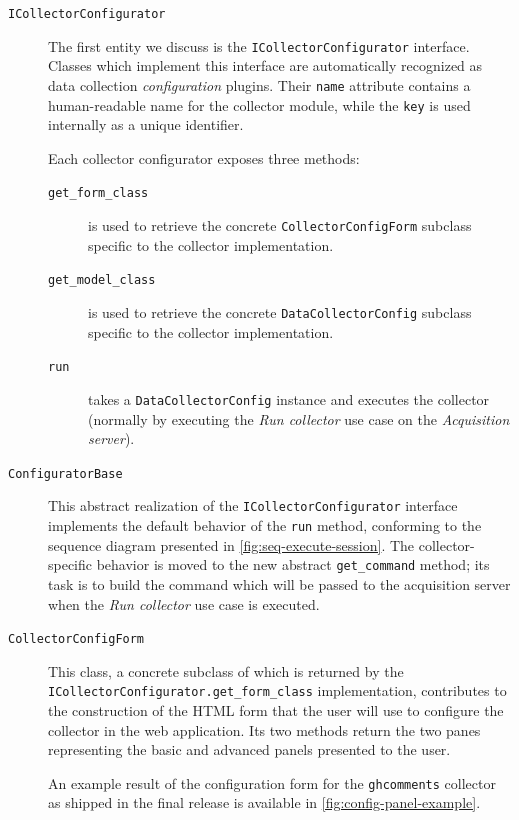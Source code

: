 \begin{description}
  \item[\texttt{ICollectorConfigurator}] The first entity we discuss is the \texttt{ICollectorConfigurator} interface. Classes which implement this interface are automatically recognized as data collection \emph{configuration} plugins. Their \texttt{name} attribute contains a human-readable name for the collector module, while the \texttt{key} is used internally as a unique identifier.

    Each collector configurator exposes three methods:
    \begin{description}
      \item[\texttt{get\_form\_class}] is used to retrieve the concrete \texttt{CollectorConfigForm} subclass specific to the collector implementation.
      \item[\texttt{get\_model\_class}] is used to retrieve the concrete \texttt{DataCollectorConfig} subclass specific to the collector implementation.
      \item[\texttt{run}] takes a \texttt{DataCollectorConfig} instance and executes the collector (normally by executing the \emph{Run collector} use case on the \emph{Acquisition server}).
    \end{description}
  
  \item[\texttt{ConfiguratorBase}] This abstract realization of the \texttt{ICollectorConfigurator} interface implements the default behavior of the \texttt{run} method, conforming to the sequence diagram presented in \vref{fig:seq-execute-session}. The collector-specific behavior is moved to the new abstract \texttt{get\_command} method; its task is to build the command which will be passed to the acquisition server when the \emph{Run collector} use case is executed.

  \item[\texttt{CollectorConfigForm}] This class, a concrete subclass of which is returned by the \texttt{ICollector\BreakableSlash{}Configurator.get\_form\_class} implementation, contributes to the construction of the HTML form that the user will use to configure the collector in the web application. Its two methods return the two panes representing the basic and advanced panels presented to the user.

    An example result of the configuration form for the \texttt{ghcomments} collector as shipped in the final release is available in \vref{fig:config-panel-example}.


\end{description}
